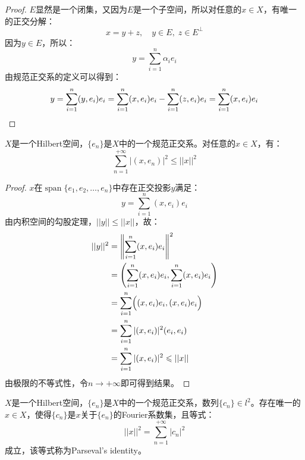 \begin{proof}
	$E$显然是一个闭集，又因为$E$是一个子空间，所以对任意的$x\in X$，有唯一的正交分解：
	\begin{equation*}
		x=y+z,\quad y\in E,\;z\in E^{\perp}
	\end{equation*}
	因为$y\in E$，所以：
	\begin{equation*}
		y=\sum_{i=1}^{n}\alpha_ie_i
	\end{equation*}
	由规范正交系的定义可以得到：
	\begin{equation*}
		y=\sum_{i=1}^{n}(y,e_i)e_i=\sum_{i=1}^{n}(x,e_i)e_i-\sum_{i=1}^{n}(z,e_i)e_i=\sum_{i=1}^{n}(x,e_i)e_i\qedhere
	\end{equation*}
\end{proof}
\begin{theorem}
	$X$是一个Hilbert空间，$\{e_n\}$是$X$中的一个规范正交系。对任意的$x\in X$，有：
	\begin{equation*}
		\sum_{n=1}^{+\infty}|(x,e_n)|^2\leqslant||x||^2
	\end{equation*}
\end{theorem}
\begin{proof}
	$x$在$\operatorname{span}\{e_1,e_2,\dots,e_n\}$中存在正交投影$y$满足：
	\begin{equation*}
		y=\sum_{i=1}^{n}(x,e_i)e_i
	\end{equation*}
	由内积空间的勾股定理，$||y||\leqslant||x||$，故：
	\begin{align*}
		||y||^2
		&=\left\|\sum_{i=1}^{n}(x,e_i)e_i\right\|^2 \\
		&=\left(\sum_{i=1}^{n}(x,e_i)e_i,\sum_{i=1}^{n}(x,e_i)e_i\right) \\
		&=\sum_{i=1}^n\Bigl((x,e_i)e_i,(x,e_i)e_i\Bigr) \\
		&=\sum_{i=1}^n|(x,e_i)|^2(e_i,e_i) \\
		&=\sum_{i=1}^n|(x,e_i)|^2\leqslant||x||
	\end{align*}
	由极限的不等式性，令$n\to+\infty$即可得到结果。
\end{proof}
\begin{theorem}\label{theo:Parseval's identity}
	$X$是一个Hilbert空间，$\{e_n\}$是$X$中的一个规范正交系，数列$\{c_n\}\in l^2$。存在唯一的$x\in X$，使得$\{c_n\}$是$x$关于$\{e_n\}$的Fourier系数集，且等式：
	\begin{equation*}
		||x||^2=\sum_{n=1}^{+\infty}|c_n|^2
	\end{equation*}
	成立，该等式称为Parseval's identity。
\end{theorem}
